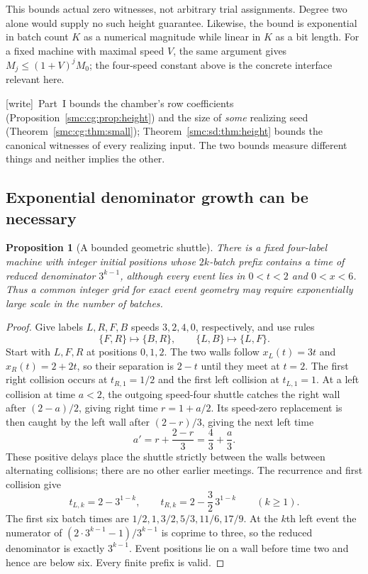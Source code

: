 \documentclass[11pt,letterpaper]{article}
\numberwithin{equation}{section}
\newtheorem{proposition}[theorem]{Proposition}
\theoremstyle{definition}
\theoremstyle{remark}
\newcommand{\wtag}{\textup{[write]}}
\begin{document}
This bounds actual zero witnesses, not arbitrary trial assignments. Degree two alone would supply no such height guarantee. Likewise, the bound is exponential in batch count $K$ as a numerical magnitude while linear in $K$ as a bit length. For a fixed machine with maximal speed $V$, the same argument gives $M_j\le(1+V)^jM_0$; the four-speed constant above is the concrete interface relevant here.


\wtag\ Part~I bounds the chamber's row coefficients (Proposition~\ref{smc:cg:prop:height}) and the size of \emph{some} realizing seed (Theorem~\ref{smc:cg:thm:small}); Theorem~\ref{smc:sd:thm:height} bounds the canonical witnesses of every realizing input. The two bounds measure different things and neither implies the other.

\subsection{Exponential denominator growth can be necessary}
\begin{proposition}[A bounded geometric shuttle]\label{smc:sd:prop:sharpness}
There is a fixed four-label machine with integer initial positions whose $2k$-batch prefix contains a time of reduced denominator $3^{k-1}$, although every event lies in $0<t<2$ and $0<x<6$. Thus a common integer grid for exact event geometry may require exponentially large scale in the number of batches.
\end{proposition}
\begin{proof}
Give labels $L,R,F,B$ speeds $3,2,4,0$, respectively, and use rules
\[
 \{F,R\}\longmapsto\{B,R\},\qquad
 \{L,B\}\longmapsto\{L,F\}.
\]
Start with $L,F,R$ at positions $0,1,2$. The two walls follow $x_L(t)=3t$ and $x_R(t)=2+2t$, so their separation is $2-t$ until they meet at $t=2$. The first right collision occurs at $t_{R,1}=1/2$ and the first left collision at $t_{L,1}=1$. At a left collision at time $a<2$, the outgoing speed-four shuttle catches the right wall after $(2-a)/2$, giving right time $r=1+a/2$. Its speed-zero replacement is then caught by the left wall after $(2-r)/3$, giving the next left time
\[
 a'=r+\frac{2-r}{3}=\frac43+\frac a3.
\]
These positive delays place the shuttle strictly between the walls between alternating collisions; there are no other earlier meetings. The recurrence and first collision give
\[
 t_{L,k}=2-3^{1-k},\qquad
 t_{R,k}=2-\frac32\,3^{1-k}\qquad(k\ge1).
\]
The first six batch times are $1/2,1,3/2,5/3,11/6,17/9$. At the $k$th left event the numerator of $(2\cdot3^{k-1}-1)/3^{k-1}$ is coprime to three, so the reduced denominator is exactly $3^{k-1}$. Event positions lie on a wall before time two and hence are below six. Every finite prefix is valid.
\end{proof}
\end{document}
